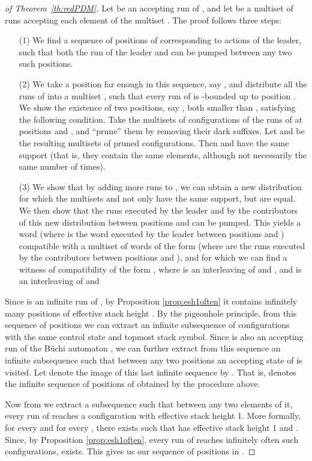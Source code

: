 \documentclass{llncs}
\begin{document}
\begin{definition}
\begin{proof}[of Theorem~\ref{th:redPDM}]
  Let   be an accepting run of , and let  be a multiset of runs accepting each element of  the multiset . The proof follows three steps: 
  \begin{itemize}
  \item[(1)] We find a sequence of positions of  corresponding to actions of the leader, such
  that both the run of the leader and  can be pumped between any
  two such positions. 
  \item[(2)] We take a position far enough in this sequence, say , and distribute all the runs of  
  into a multiset , such that every run of  is -bounded up to position .  We show the existence of two positions, say ,
  both smaller than , satisfying the following condition. Take the multisets of 
  configurations of the runs of  at positions  and , and ``prune'' 
  them by removing their dark suffixes. Let  and  be the resulting multisets of pruned configurations. Then  and   have the same support (that is, they contain the same elements, although not necessarily the same number of times).
  \item[(3)]  We show that by adding more runs to , we can obtain a new distribution for which the multisets
    and  not only have the same support, but are equal. We then show that the runs executed by the  leader and by the contributors
    of this new distribution between positions  and  can be pumped. This yields a word  (where  is the word executed by the leader between positions  and ) compatible with a multiset of words of the form 
     (where  are the runs executed by the contributors between positions  and ), and for which we can find a witness of compatibility of the form , where  is an interleaving of  and , and  is an interleaving of  and 
    \end{itemize}

   Since  is an infinite run of , by Proposition 
  \ref{prop:esh1often} it contains infinitely many positions of effective stack height . 
   By the pigeonhole principle,  from this sequence 
  of positions we can extract an infinite subsequence of configurations with the same
  control state and topmost stack symbol. Since  is also an accepting run of the B\"uchi automaton  , we can further extract  from this sequence an infinite
  subsequence such that between any two positions  an
  accepting state of  is visited. Let  denote the image of this last infinite sequence
  by . That is,  denotes the infinite sequence of positions of  obtained by the procedure above.

  Now from  we extract a subsequence  such that between any
  two elements of it, every run of  reaches a configuration with
  effective stack height 1. More formally, for every  and for every , there exists  such that
   has effective stack height 1 and .  Since, by Proposition 
  \ref{prop:esh1often}, every run of 
  reaches infinitely often such configurations,  exists.  
  This gives us our sequence of positions in .
  

\end{proof}
\end{definition}
\end{document}

